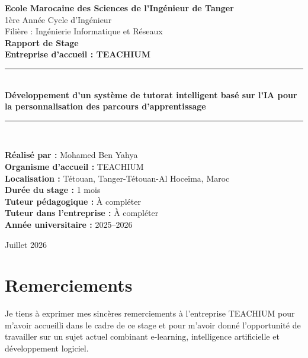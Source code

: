 \documentclass[12pt,a4paper]{report}
\begin{document}
\begin{titlepage}
    \centering
    \vspace*{1cm}
    {\Large \textbf{Ecole Marocaine des Sciences de l'Ingénieur de Tanger}}\\[0.6cm]
    {\large 1ère Année Cycle d'Ingénieur}\\[0.4cm]
    {\large Filière : Ingénierie Informatique et Réseaux}\\[1.2cm]
    
    {\Huge \textbf{Rapport de Stage}}\\[0.6cm]
    {\Large \textbf{Entreprise d'accueil : TEACHIUM}}\\[1.2cm]
    
    \rule{\linewidth}{0.5mm}\\[0.5cm]
    {\Large \textbf{Développement d'un système de tutorat intelligent basé sur l'IA pour la personnalisation des parcours d'apprentissage}}\\[0.5cm]
    \rule{\linewidth}{0.5mm}\\[1.5cm]
    
    \begin{flushleft}
    \large
    \textbf{Réalisé par :} Mohamed Ben Yahya\\[0.3cm]
    \textbf{Organisme d'accueil :} TEACHIUM\\[0.3cm]
    \textbf{Localisation :} Tétouan, Tanger-Tétouan-Al Hoceïma, Maroc\\[0.3cm]
    \textbf{Durée du stage :} 1 mois\\[0.3cm]
    \textbf{Tuteur pédagogique :} À compléter\\[0.3cm]
    \textbf{Tuteur dans l'entreprise :} À compléter\\[0.3cm]
    \textbf{Année universitaire :} 2025--2026
    \end{flushleft}
    
    \vfill
    {\large Juillet 2026}
\end{titlepage}

\chapter*{Remerciements}

Je tiens à exprimer mes sincères remerciements à l'entreprise TEACHIUM pour m'avoir accueilli dans le cadre de ce stage et pour m'avoir donné l'opportunité de travailler sur un sujet actuel combinant e-learning, intelligence artificielle et développement logiciel.
\end{document}

